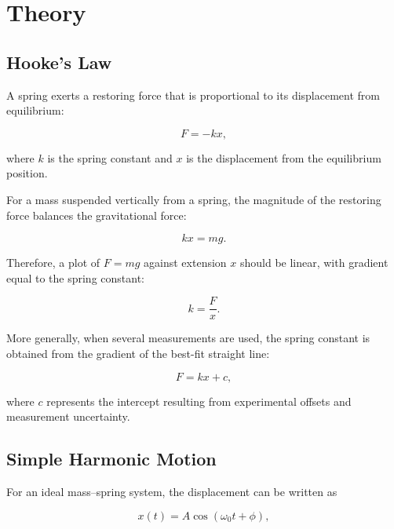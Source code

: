 \documentclass[12pt,a4paper]{article}
\begin{document}
\section{Theory}

\subsection{Hooke's Law}

A spring exerts a restoring force that is proportional to its displacement from equilibrium:

\begin{equation}
F=-kx,
\label{eq:hooke}
\end{equation}

where $k$ is the spring constant and $x$ is the displacement from the equilibrium position.

For a mass suspended vertically from a spring, the magnitude of the restoring force balances the gravitational force:

\begin{equation}
kx=mg.
\label{eq:static}
\end{equation}

Therefore, a plot of $F=mg$ against extension $x$ should be linear, with gradient equal to the spring constant:

\begin{equation}
k=\frac{F}{x}.
\label{eq:k_static}
\end{equation}

More generally, when several measurements are used, the spring constant is obtained from the gradient of the best-fit straight line:

\begin{equation}
F=kx+c,
\end{equation}

where $c$ represents the intercept resulting from experimental offsets and measurement uncertainty.

\subsection{Simple Harmonic Motion}

For an ideal mass--spring system, the displacement can be written as

\begin{equation}
x(t)=A\cos(\omega_0t+\phi),
\label{eq:shm}
\end{equation}
\end{document}
